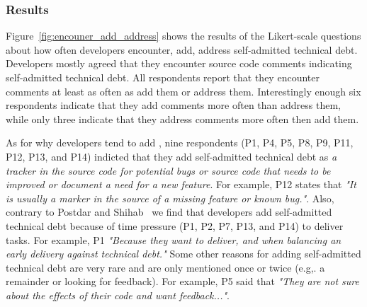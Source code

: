 \subsubsection*{Results} 
Figure~\ref{fig:encouner_add_address} shows the results of the Likert-scale questions about how often developers encounter, add, address self-admitted technical debt. Developers mostly agreed that they encounter source code comments indicating self-admitted technical debt. 
All respondents report that they encounter \SATD comments at least as often as add them or address them.
Interestingly enough six respondents indicate that they add \SATD comments more often than address them,
while only three indicate that they address \SATD comments more often then add them.

As for why developers tend to add \SATD, nine respondents (P1, P4, P5, P8, P9, P11, P12, P13, and P14) indicted that they add self-admitted technical debt as \emph{a tracker in the source code for potential bugs or source code that needs to be improved or document a need for a new feature}. For example, P12 states that \textit{"It is usually a marker in the source of a missing feature or known bug."}. Also, contrary to Postdar and Shihab~\cite{Potdar2014ICSME} we find that developers add self-admitted technical debt because of time pressure (P1, P2, P7, P13, and P14) to deliver tasks. For example, P1 \textit{"Because they want to deliver, and when balancing an early delivery against technical debt."} Some other reasons for adding self-admitted technical debt are very rare and are only mentioned once or twice (e.g,. a remainder or looking for feedback). For example, P5 said that \textit{"They are not sure about the effects of their code and want feedback..."}.

